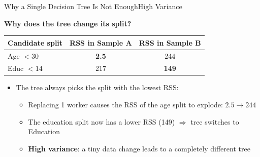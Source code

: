 \documentclass[hyperref={pdfpagelabels=false}]{beamer}
\begin{document}
\begin{frame}{Why a Single Decision Tree Is Not Enough}{High Variance}

\textbf{Why does the tree change its split?}

\vspace{0.2cm}
\begin{center}
\begin{tabular}{@{}lcc@{}}
  \toprule
  Candidate split & RSS in Sample A & RSS in Sample B \\
  \midrule
  Age $< 30$  & \textbf{2.5} & 244 \\
  Educ $< 14$ & 217          & \textbf{149} \\
  \bottomrule
\end{tabular}
\end{center}

\vspace{0.2cm}
\begin{itemize}

\item The tree always picks the split with the lowest RSS:
\begin{itemize}
  \item Replacing 1 worker causes the RSS of the age split to explode: $2.5 \to 244$
  \vspace{0.1cm}
  \item The education split now has a lower RSS (149) $\Rightarrow$ tree switches to Education
  \vspace{0.1cm}
  \item[$\Rightarrow$] \textbf{High variance}: a tiny data change leads to a completely different tree
\end{itemize}
\end{itemize}

\end{frame}
\end{document}
